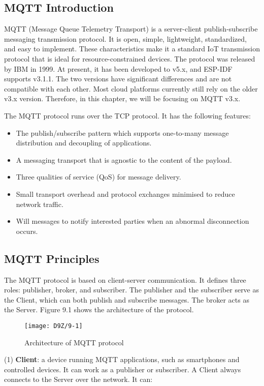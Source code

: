 \documentclass[a4paper,12pt]{book}
\begin{document}
\subsection{MQTT Introduction}
MQTT (Message Queue Telemetry Transport) is a server-client publish-subscribe messaging transmission protocol. It is open, simple, lightweight, standardized, and easy to implement. These characteristics make it a standard IoT transmission protocol that is ideal for resource-constrained devices. The protocol was released by IBM in 1999. At present, it has been developed to v5.x, and ESP-IDF supports v3.1.1. The two versions have significant differences and are not compatible with each other. Most cloud platforms currently still rely on the older v3.x version. Therefore, in this chapter, we will be focusing on MQTT v3.x.

The MQTT protocol runs over the TCP protocol. It has the following features:

\begin{itemize}[noitemsep]
    \item The publish/subscribe pattern which supports one-to-many message distribution and decoupling of applications.
    \item A messaging transport that is agnostic to the content of the payload.
    \item Three qualities of service (QoS) for message delivery.
    \item Small transport overhead and protocol exchanges minimised to reduce network traffic.
    \item Will messages to notify interested parties when an abnormal disconnection occurs.
\end{itemize}

\subsection{MQTT Principles}
The MQTT protocol is based on client-server communication. It defines three roles: publisher, broker, and subscriber. The publisher and the subscriber serve as the Client, which can both publish and subscribe messages. The broker acts as the Server. Figure 9.1 shows the architecture of the protocol.

\begin{figure}[!h]
    \centering
    \texttt{[image: D9Z/9-1]}
    \caption{Architecture of MQTT protocol}
\end{figure}

(1) \textbf{Client}: a device running MQTT applications, such as smartphones and controlled devices. It can work as a publisher or subscriber. A Client always connects to the Server over the network. It can:
\end{document}

